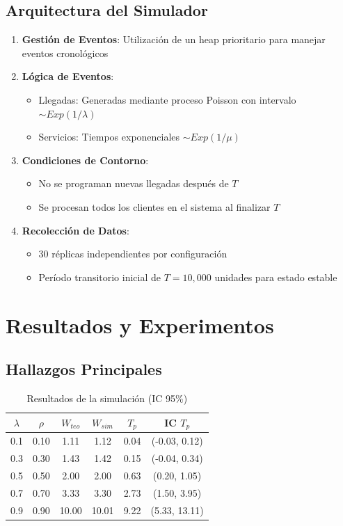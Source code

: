 \documentclass{article}
\begin{document}
	\subsection{Arquitectura del Simulador}
	\begin{enumerate}
		\item \textbf{Gestión de Eventos}: Utilización de un heap prioritario para manejar eventos cronológicos
		\item \textbf{Lógica de Eventos}:
		\begin{itemize}
			\item Llegadas: Generadas mediante proceso Poisson con intervalo $\sim Exp(1/\lambda)$
			\item Servicios: Tiempos exponenciales $\sim Exp(1/\mu)$
		\end{itemize}
		\item \textbf{Condiciones de Contorno}:
		\begin{itemize}
			\item No se programan nuevas llegadas después de $T$
			\item Se procesan todos los clientes en el sistema al finalizar $T$
		\end{itemize}
		\item \textbf{Recolección de Datos}:
		\begin{itemize}
			\item 30 réplicas independientes por configuración
			\item Período transitorio inicial de $T=10,000$ unidades para estado estable
		\end{itemize}
	\end{enumerate}
	
	\section{Resultados y Experimentos} \label{S3}
	\subsection{Hallazgos Principales}
	\begin{table}[h]
		\centering
		\caption{Resultados de la simulación (IC 95\%)}
		\label{tab:results}
		\begin{tabular}{@{}cccccc@{}}
			\toprule
			$\lambda$ & $\rho$ & $W_{teo}$ & $W_{sim}$ & $T_p$ & IC $T_p$ \\
			\midrule
			0.1 & 0.10 & 1.11 & 1.12 & 0.04 & (-0.03, 0.12) \\
			0.3 & 0.30 & 1.43 & 1.42 & 0.15 & (-0.04, 0.34) \\
			0.5 & 0.50 & 2.00 & 2.00 & 0.63 & (0.20, 1.05) \\
			0.7 & 0.70 & 3.33 & 3.30 & 2.73 & (1.50, 3.95) \\
			0.9 & 0.90 & 10.00 & 10.01 & 9.22 & (5.33, 13.11) \\
			\bottomrule
		\end{tabular}
	\end{table}
	
\end{document}
